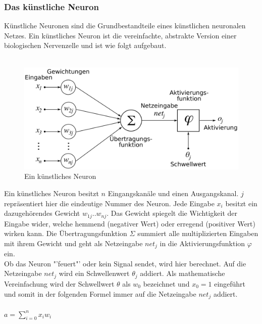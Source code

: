 \documentclass[12pt,oneside,a4paper,parskip]{scrbook}
\begin{document}
\subsubsection{Das künstliche Neuron}
Künstliche Neuronen sind die Grundbestandteile eines künstlichen neuronalen Netzes.
Ein künstliches Neuron ist die vereinfachte, abstrakte Version einer biologischen Nervenzelle und ist wie folgt aufgebaut.\\\\
\begin{figure}[h]
	\begin{center}
		\includegraphics[width=12cm]{Bilder/ArtificialNeuronModel_deutsch.png}
		\caption{Ein künstliches Neuron\cite{wikiNN}}
		\label{fig:wikiNeuron}
	\end{center}
\end{figure}
Ein künstliches Neuron besitzt $n$ Eingangskanäle und einen Ausgangskanal. $j$ repräsentiert hier die eindeutige Nummer des Neuron. Jede Eingabe $x_{i}$ besitzt ein dazugehörendes Gewicht $w_{1j}..w_{nj}$. Das Gewicht spiegelt die Wichtigkeit der Eingabe wider, welche hemmend (negativer Wert) oder erregend (positiver Wert) wirken kann. Die Übertragungsfunktion $\Sigma$ summiert alle multiplizierten Eingaben mit ihrem Gewicht und geht als Netzeingabe $net_j$ in die Aktivierungsfunktion $\varphi$ ein. \\
Ob das Neuron "'feuert"' oder kein Signal sendet, wird hier berechnet. Auf die Netzeingabe $net_j$ wird ein Schwellenwert $\theta_j$ addiert. Als mathematische Vereinfachung wird der Schwellwert $\theta$ als $w_0$ bezeichnet und $x_0 = 1$ eingeführt und somit in der folgenden Formel immer auf die Netzeingabe $net_j$ addiert.
\\\\
${\displaystyle a=\sum _{i=0}^{n}x_{i}w_{i}}$
\\\\
\end{document}
